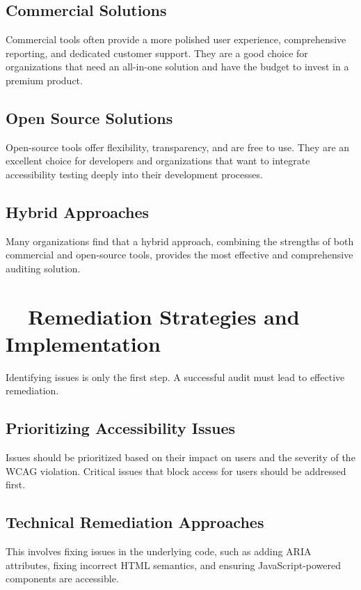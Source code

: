 \subsection{Commercial Solutions}
\label{subsec:commercial-solutions}
Commercial tools often provide a more polished user experience, comprehensive reporting, and dedicated customer support. They are a good choice for organizations that need an all-in-one solution and have the budget to invest in a premium product.

\subsection{Open Source Solutions}
\label{subsec:open-source-solutions}
Open-source tools offer flexibility, transparency, and are free to use. They are an excellent choice for developers and organizations that want to integrate accessibility testing deeply into their development processes.

\subsection{Hybrid Approaches}
\label{subsec:hybrid-approaches}
Many organizations find that a hybrid approach, combining the strengths of both commercial and open-source tools, provides the most effective and comprehensive auditing solution.

\section{~~Remediation Strategies and Implementation}
\label{sec:remediation-strategies}
Identifying  issues is only the first step. A successful audit must lead to effective remediation.

\subsection{Prioritizing Accessibility Issues}
\label{subsec:prioritizing-issues}
Issues should be prioritized based on their impact on users and the severity of the WCAG violation. Critical issues that block access for users should be addressed first.
\supercite{PowerAccessibility}

\subsection{Technical Remediation Approaches}
\label{subsec:technical-remediation}
This involves fixing issues in the underlying code, such as adding ARIA attributes, fixing incorrect HTML semantics, and ensuring JavaScript-powered components are accessible.
\supercite{ARIA}

